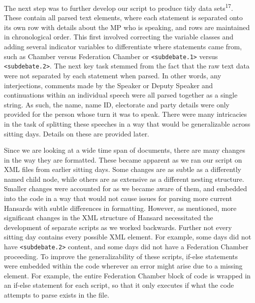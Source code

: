 \documentclass[
  letterpaper,
  DIV=11,
  numbers=noendperiod]{scrartcl}
\begin{document}
The next step was to further develop our script to produce tidy data
sets\textsuperscript{17}. These contain all parsed text elements, where
each statement is separated onto its own row with details about the MP
who is speaking, and rows are maintained in chronological order. This
first involved correcting the variable classes and adding several
indicator variables to differentiate where statements came from, such as
Chamber versus Federation Chamber or
\texttt{\textless{}subdebate.1\textgreater{}} versus
\texttt{\textless{}subdebate.2\textgreater{}}. The next key task stemmed
from the fact that the raw text data were not separated by each
statement when parsed. In other words, any interjections, comments made
by the Speaker or Deputy Speaker and continuations within an individual
speech were all parsed together as a single string. As such, the name,
name ID, electorate and party details were only provided for the person
whose turn it was to speak. There were many intricacies in the task of
splitting these speeches in a way that would be generalizable across
sitting days. Details on these are provided later.

Since we are looking at a wide time span of documents, there are many
changes in the way they are formatted. These became apparent as we ran
our script on XML files from earlier sitting days. Some changes are as
subtle as a differently named child node, while others are as extensive
as a different nesting structure. Smaller changes were accounted for as
we became aware of them, and embedded into the code in a way that would
not cause issues for parsing more current Hansards with subtle
differences in formatting. However, as mentioned, more significant
changes in the XML structure of Hansard necessitated the development of
separate scripts as we worked backwards. Further not every sitting day
contains every possible XML element. For example, some days did not have
\texttt{\textless{}subdebate.2\textgreater{}} content, and some days did
not have a Federation Chamber proceeding. To improve the
generalizability of these scripts, if-else statements were embedded
within the code wherever an error might arise due to a missing element.
For example, the entire Federation Chamber block of code is wrapped in
an if-else statement for each script, so that it only executes if what
the code attempts to parse exists in the file.
\end{document}
